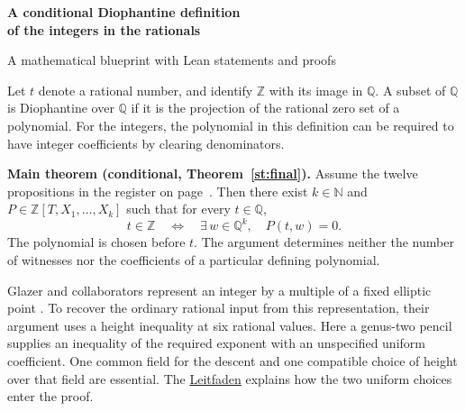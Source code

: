 \documentclass[10pt,a4paper]{article}
\newcommand{\Q}{\mathbb Q}\newcommand{\Z}{\mathbb Z}\newcommand{\N}{\mathbb N}\newcommand{\C}{\mathbb C}
\begin{document}
\thispagestyle{empty}
\vspace*{4mm}
{\fontsize{28}{32}\selectfont\bfseries A conditional Diophantine definition\\of the integers in the rationals\par}
\smallskip
{\large\color{quiet}A mathematical blueprint with Lean statements and proofs\par}
\vspace{6mm}
Let $t$ denote a rational number, and identify $\Z$ with its image in $\Q$. A subset of $\Q$ is Diophantine over $\Q$ if it is the projection of the rational zero set of a polynomial. For the integers, the polynomial in this definition can be required to have integer coefficients by clearing denominators.

\medskip
\textbf{Main theorem (conditional, Theorem~\hyperref[st:final]{\ref*{st:final}}).}
Assume the twelve propositions in the register on page~\pageref{register}. Then there exist $k\in\N$ and $P\in\Z[T,X_1,\ldots,X_k]$ such that for every $t\in\Q$,
\[
                   t\in\Z
       \quad\Longleftrightarrow\quad
                   \exists\,w\in\Q^k,\quad P(t,w)=0.
\]
The polynomial is chosen before $t$. The argument determines neither the number of witnesses nor the coefficients of a particular defining polynomial.

\medskip
Glazer and collaborators represent an integer by a multiple of a fixed elliptic point \cite{Glazer}. To recover the ordinary rational input from this representation, their argument uses a height inequality at six rational values. Here a genus-two pencil supplies an inequality of the required exponent with an unspecified uniform coefficient. One common field for the descent and one compatible choice of height over that field are essential. The \hyperref[roadmap]{Leitfaden} explains how the two uniform choices enter the proof.
\end{document}
